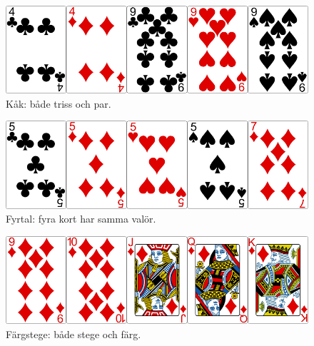 \begin{figure}[H]
 \begin{minipage}[c]{\CardWidth}
  \includegraphics[width=\textwidth]{../img/w05-hands/fullhouse.png}
 \end{minipage}
 \begin{minipage}[c]{\CardCaptionWidth}
  \caption{Kåk: både triss och par.}
 \end{minipage}
\end{figure}

\begin{figure}[H]
 \begin{minipage}[c]{\CardWidth}
  \includegraphics[width=\textwidth]{../img/w05-hands/fours.png}
 \end{minipage}
 \begin{minipage}[c]{\CardCaptionWidth}
  \caption{Fyrtal: fyra kort har samma valör.}
 \end{minipage}
\end{figure}

\begin{figure}[H]
 \begin{minipage}[c]{\CardWidth}
  \includegraphics[width=\textwidth]{../img/w05-hands/straightflush.png}
 \end{minipage}
 \begin{minipage}[c]{\CardCaptionWidth}
  \caption{Färgstege: både stege och färg.}
 \end{minipage}
\end{figure}

